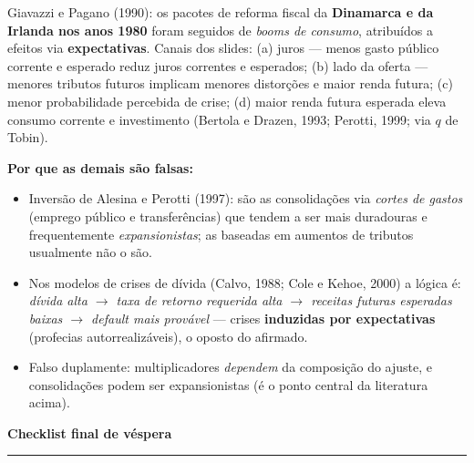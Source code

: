 \documentclass[12pt, a4paper]{article}
\begin{document}
\begin{correctbox}[title={Resposta correta: b)}]
Giavazzi e Pagano (1990): os pacotes de reforma fiscal da \textbf{Dinamarca e
da Irlanda nos anos 1980} foram seguidos de \emph{booms de consumo}, atribuídos
a efeitos via \textbf{expectativas}. Canais dos slides: (a) juros --- menos
gasto público corrente e esperado reduz juros correntes e esperados; (b) lado
da oferta --- menores tributos futuros implicam menores distorções e maior
renda futura; (c) menor probabilidade percebida de crise; (d) maior renda
futura esperada eleva consumo corrente e investimento (Bertola e Drazen, 1993;
Perotti, 1999; via $q$ de Tobin). \checkmark

\textbf{Por que as demais são falsas:}
\begin{itemize}[leftmargin=*]
\item[a)] Inversão de Alesina e Perotti (1997): são as consolidações via
\emph{cortes de gastos} (emprego público e transferências) que tendem a ser
mais duradouras e frequentemente \emph{expansionistas}; as baseadas em aumentos
de tributos usualmente não o são.
\item[c)] Nos modelos de crises de dívida (Calvo, 1988; Cole e Kehoe, 2000) a
lógica é: \emph{dívida alta $\rightarrow$ taxa de retorno requerida alta
$\rightarrow$ receitas futuras esperadas baixas $\rightarrow$ default mais
provável} --- crises \textbf{induzidas por expectativas} (profecias
autorrealizáveis), o oposto do afirmado.
\item[d)] Falso duplamente: multiplicadores \emph{dependem} da composição do
ajuste, e consolidações podem ser expansionistas (é o ponto central da
literatura acima).
\end{itemize}
\end{correctbox}

\newpage
\begin{center}
{\large\bfseries\color{orangerbc} Checklist final de véspera}\\[0.2em]
\rule{\linewidth}{0.6pt}
\end{center}
\end{document}
